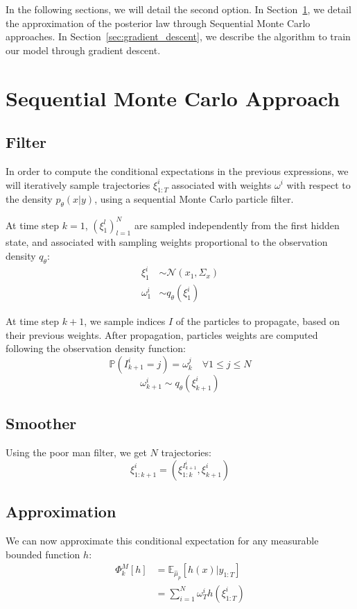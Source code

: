 \documentclass[10pt,a4paper]{report}
\begin{document}
In the following sections, we will detail the second option.
In Section~\ref{sec:smc}, we detail the approximation of the posterior law through Sequential Monte Carlo approaches.
In Section~\ref{sec:gradient_descent}, we describe the algorithm to train our model through gradient descent.


\section{Sequential Monte Carlo Approach}
\label{sec:smc}

\subsection{Filter}
In order to compute the conditional expectations in the previous expressions, we will iteratively sample trajectories $\xi_{1:T}^i$ associated with weights $\omega^i$ with respect to the density $p_\theta(x | y)$, using a sequential Monte Carlo particle filter.

At time step $k=1$, $(\xi_1^l)_{l=1}^N$ are sampled independently from the first hidden state, and associated with sampling weights proportional to the observation density $q_\theta$:
\begin{align*}
    \xi_1^i    & \sim \mathcal{N}(x_1, \Sigma_x) \\
    \omega_1^i & \sim q_\theta(\xi_1^i)
\end{align*}

At time step $k+1$, we sample indices $I$ of the particles to propagate, based on their previous weights.
After propagation, particles weights are computed following the observation density function:
$$\mathbb{P}(I_{k+1}^i=j) = \omega_k^j \quad \forall 1 \leq j \leq N$$
$$\omega_{k+1}^i \sim q_\theta(\xi_{k+1}^i)$$

\subsection{Smoother}
Using the poor man filter, we get $N$ trajectories:
$$\xi_{1:k+1}^{i} = (\xi_{1:k}^{I_{k+1}^i}, \xi_{k+1}^i)$$

\subsection{Approximation}
We can now approximate this conditional expectation for any measurable bounded function $h$:
\begin{align*}
    \Phi_k^M[h] & = \mathbb{E}_{\hat \mu_p} \left[ h(x) | y_{1:T} \right] \\
                & = \sum_{i=1}^N \omega_T^i h(\xi_{1:T}^i)
\end{align*}
\end{document}
